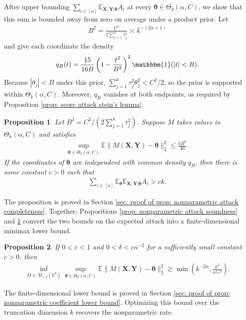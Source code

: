 \documentclass[letterpaper,12pt]{article}
\numberwithin{equation}{section}
\theoremstyle{plain}
\numberwithin{Theorem}{section}
\newtheorem{proposition}{Proposition}
\numberwithin{proposition}{section}
\numberwithin{Lemma}{section}
{
	\theoremstyle{definition}
	\newtheorem{Definition}{Definition}
	\newtheorem{example}{Example}
	\numberwithin{example}{section}
	\newtheorem{fact}{Fact}
	\numberwithin{fact}{section}
	\newtheorem{remark}{Remark}
}
\newcommand{\rev}[1]{#1}
\newcommand{\furtherrev}[1]{#1}
\newcommand{\1}{\mathbbm{1}}
\def\bth{{\boldsymbol{\theta}}}
\def\E{\mathbb{E}}
\begin{document}
	{After upper bounding $\sum_{i \in [n]} \E_{\bm X, \bm Y|\bth} A_{i}$ at every $\bth \in \Theta_k(\alpha, C)$, we show that this sum is bounded away from zero on average under a product prior. Let
	\begin{align*}
		B^2=\frac{C^2}{2\sum_{j=1}^k\tau_j^2}\asymp k^{-(2\alpha+1)}
	\end{align*}
	and give each coordinate the density
	\begin{align*}
		q_B(t)=\frac{15}{16B}\left(1-\frac{t^2}{B^2}\right)^2\1(|t|<B).
	\end{align*}
	Because $|\theta_j|<B$ under this prior, $\sum_{j=1}^k\tau_j^2\theta_j^2<C^2/2$, so the prior is supported within $\Theta_k(\alpha,C)$. Moreover, $q_B$ vanishes at both endpoints, as required by Proposition \ref{prop: score attack stein's lemma}.}
	
	\begin{proposition}\label{prop: nonparametric attack completeness}
			\rev{Let $B^2=C^2/(2\sum_{j=1}^k\tau_j^2)$. Suppose $M$ takes values in $\Theta_k(\alpha,C)$ and satisfies}
				\begin{align*}
			\rev{\sup_{\bth \in \Theta_k(\alpha, C)} \E\|M(\bm X, \bm Y) - \bth\|_2^2 \leq \frac{kB^2}{40}.}
		\end{align*}
		\rev{If the coordinates of $\bth$ are independent with common density $q_B$,}
		then there is some constant $c > 0$ such that
		\begin{align}\label{eq: nonparametric attack completeness}
			\sum_{i \in [n]} \E_\bth \E_{\bm X, \bm Y|\bth} A_{i} > ck.
		\end{align}
	\end{proposition}
	The proposition is proved in Section \ref{sec: proof of prop: nonparametric attack completeness}. Together, Propositions \ref{prop: nonparametric attack soundness} and \ref{prop: nonparametric attack completeness} convert the two bounds on the expected attack into a finite-dimensional minimax lower bound.
	\begin{proposition}\label{prop: nonparametric coefficient lower bound}
			If $0 < \varepsilon < 1$ and $0 < \delta < cn^{-2}$ for a sufficiently small constant $c > 0$, then
		\begin{align}\label{eq: nonparametric coefficient lower bound}
			\inf_{M \in \furtherrev{\mathcal M_{\varepsilon, \delta}(\mathbb R^k)}} \sup_{\bth \in \Theta_k(\alpha, C)} \E\|M(\bm X, \bm Y)-\bth\|_2^2 \gtrsim \min\left(k^{-2\alpha}, \frac{k^2}{n^2\varepsilon^2}\right).
		\end{align}
	\end{proposition}
	The finite-dimensional lower bound is proved in Section \ref{sec: proof of prop: nonparametric coefficient lower bound}. Optimizing this bound over the truncation dimension $k$ recovers the \furtherrev{nonparametric} rate.
	
\end{document}
